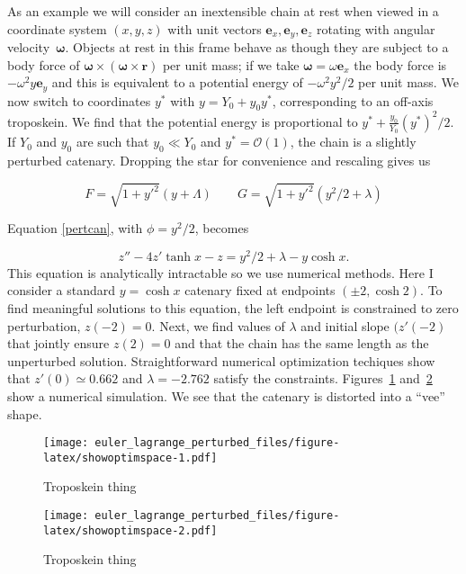 \documentclass[pdflatex,sn-mathphys-num]{sn-jnl}%
\theoremstyle{thmstyleone}%
\theoremstyle{thmstyletwo}%
\theoremstyle{thmstylethree}%
\begin{document}
As an example we will consider an inextensible chain at rest when
viewed in a coordinate system $(x,y,z)$ with unit vectors
$\boldsymbol{e}_x,\boldsymbol{e}_y,\boldsymbol{e}_z$ rotating with
angular velocity~$\boldsymbol{\omega}$.  Objects at rest in this frame
behave as though they are subject to a body force of
$\boldsymbol{\omega}\times\left(\boldsymbol{\omega}\times\boldsymbol{r}\right)$
per unit mass; if we take $\boldsymbol{\omega}=\omega\boldsymbol{e}_x$
the body force is $-\omega^2y\boldsymbol{e}_y$ and this is equivalent
to a potential energy of $-\omega^2y^2/2$ per unit mass.  We now
switch to coordinates $y^*$ with $y = Y_0 + y_0y^*$, corresponding to
an off-axis troposkein.  We find that the potential energy is
proportional to $y^* +
\frac{y_0}{Y_0}\left(y^*\right)^2/2$.  If
$Y_0$ and $y_0$ are such that $y_0\ll Y_0$ and $y^*={\mathcal O}(1)$,
the chain is a slightly perturbed catenary.  Dropping the star for
convenience and rescaling gives us

\begin{equation}
  F = \sqrt{1+y'^2}(y+\Lambda)\qquad
  G = \sqrt{1+y'^2}(y^2/2 + \lambda)
\end{equation}

Equation \ref{pertcan}, with $\phi=y^2/2$, becomes

\begin{equation}
  z'' - 4z'\tanh x - z = y^2/2 + \lambda -y\cosh x.
\end{equation}
%
This equation is analytically intractable so we use numerical methods.
Here I consider a standard $y=\cosh x$ catenary fixed at endpoints
$(\pm 2, \cosh 2)$.  To find meaningful solutions to this equation,
the left endpoint is constrained to zero perturbation, $z(-2)=0$.
Next, we find values of $\lambda$ and initial slope $(z'(-2)$ that
jointly ensure $z(2)=0$ and that the chain has the same length as the
unperturbed solution.  Straightforward numerical optimization
techiques show that $z'(0)\simeq 0.662$ and $\lambda = -2.762$ satisfy
the constraints.  Figures~\ref{space} and~\ref{space2} show a
numerical simulation.  We see that the catenary is distorted into a
``vee'' shape.

\begin{figure}[h]
\centering
\texttt{[image: euler\_lagrange\_perturbed\_files/figure-latex/showoptimspace-1.pdf]}
\caption{Troposkein thing}\label{space}
\end{figure}

\begin{figure}[h]
\centering
\texttt{[image: euler\_lagrange\_perturbed\_files/figure-latex/showoptimspace-2.pdf]}
\caption{Troposkein thing}\label{space2}
\end{figure}
\end{document}
